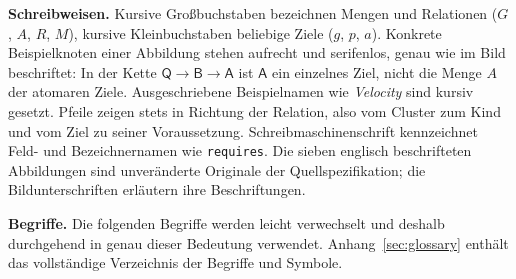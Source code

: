 \documentclass[11pt,a4paper,parskip=half,headings=normal,numbers=noenddot]{scrartcl}
\newcommand{\code}[1]{\texttt{#1}}
\newcommand{\nd}[1]{\ensuremath{\mathsf{#1}}}
\begin{document}
\textbf{Schreibweisen.} Kursive Großbuchstaben bezeichnen Mengen und
Relationen ($G$, $A$, $R$, $M$), kursive Kleinbuchstaben beliebige Ziele
($g$, $p$, $a$). Konkrete Beispielknoten einer Abbildung stehen aufrecht und
serifenlos, genau wie im Bild beschriftet: In der Kette
$\nd{Q}\to\nd{B}\to\nd{A}$ ist \nd{A} ein einzelnes Ziel, nicht die Menge
$A$ der atomaren Ziele. Ausgeschriebene Beispielnamen wie \emph{Velocity}
sind kursiv gesetzt. Pfeile zeigen stets in Richtung der Relation, also
vom Cluster zum Kind und vom Ziel zu seiner Voraussetzung.
Schreibmaschinenschrift kennzeichnet Feld- und Bezeichnernamen wie
\code{requires}. Die sieben englisch beschrifteten Abbildungen sind
unveränderte Originale der Quellspezifikation; die Bildunterschriften
erläutern ihre Beschriftungen.

\textbf{Begriffe.} Die folgenden Begriffe werden leicht verwechselt und
deshalb durchgehend in genau dieser Bedeutung verwendet.
Anhang~\ref{sec:glossary} enthält das vollständige Verzeichnis der Begriffe
und Symbole.
\end{document}
